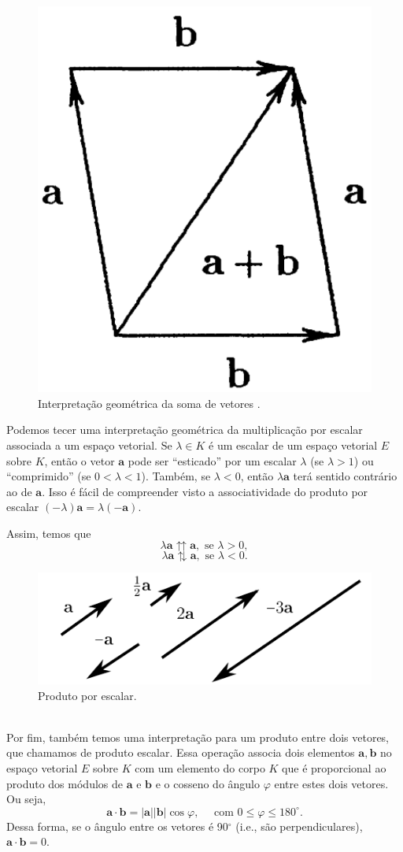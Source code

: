 \documentclass[a4paper,12pt]{report}
\theoremstyle{plain}
\theoremstyle{definition}
\newcommand{\norm}[1]{\left| #1 \right|}
\begin{document}
	\begin{figure}[H]
		\begin{center}
			\includegraphics[width=0.22\linewidth]{figures/paralelogram.pdf}
		\end{center}
		\caption{Interpretação geométrica da soma de vetores \cite{lounestoClifford}.}
		\label{fig:paralelogram}
	\end{figure}
	
	Podemos tecer uma interpretação geométrica da multiplicação por escalar associada a um espaço vetorial. Se $\lambda\in K$ é um escalar de um espaço vetorial $E$ sobre $K$, então o vetor $\mathbf a$ pode ser ``esticado'' por um escalar $\lambda$ (se $\lambda>1$) ou ``comprimido'' (se $0<\lambda<1$). Também, se $\lambda<0$, então $\lambda \mathbf a$ terá sentido contrário ao de $\mathbf a$. Isso é fácil de compreender visto a associatividade do produto por escalar $(-\lambda)\mathbf a = \lambda(-\mathbf a).$
	
	
	\begin{minipage}{0.3\linewidth}
		Assim, temos que $$\lambda \mathbf a \upuparrows \mathbf a, \text{ se } \lambda > 0,$$ $$\lambda \mathbf a \updownarrows \mathbf a, \text{ se } \lambda < 0.$$
	\end{minipage}
	\begin{minipage}{0.7\linewidth}
		\begin{figure}[H]
			\begin{center}
				\includegraphics[width=0.7\linewidth]{figures/scalarProduct.pdf}
			\end{center}
			\caption{Produto por escalar.}
			\label{fig:scalarProduct}
		\end{figure}
	\end{minipage}
	\\
	
	Por fim, também temos uma interpretação para um produto entre dois vetores, que chamamos de produto escalar. Essa operação associa dois elementos $\mathbf a, \mathbf b$ no espaço vetorial $E$ sobre $K$ com um elemento do corpo $K$ que é proporcional ao produto dos módulos de $\mathbf a$ e $\mathbf b$ e o cosseno do ângulo $\varphi$ entre estes dois vetores. Ou seja, $$\mathbf a \cdot \mathbf b = \norm{\mathbf a}\norm{\mathbf b}\cos \varphi,\quad \text{ com } 0\leq\varphi\leq 180^\circ.$$
	Dessa forma, se o ângulo entre os vetores é 90$^\circ$ (i.e., são perpendiculares), $\mathbf a \cdot \mathbf b = 0$.\\
	
\end{document}
